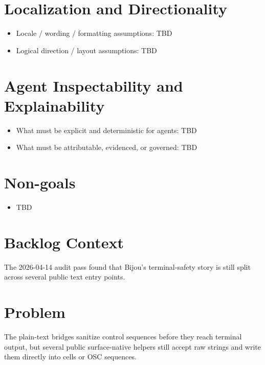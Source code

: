 \section{Localization and Directionality}\label{record-258-localization-and-directionality}

\begin{itemize}
\tightlist
\item
  Locale / wording / formatting assumptions: TBD
\item
  Logical direction / layout assumptions: TBD
\end{itemize}

\section{Agent Inspectability and Explainability}\label{record-258-agent-inspectability-and-explainability}

\begin{itemize}
\tightlist
\item
  What must be explicit and deterministic for agents: TBD
\item
  What must be attributable, evidenced, or governed: TBD
\end{itemize}

\section{Non-goals}\label{record-258-non-goals}

\begin{itemize}
\tightlist
\item[$\square$]
  TBD
\end{itemize}

\section{Backlog Context}\label{record-258-backlog-context}

The 2026-04-14 audit pass found that Bijou's terminal-safety story is still split across several public text entry points.

\section{Problem}\label{record-258-problem}

The plain-text bridges sanitize control sequences before they reach terminal output, but several public surface-native helpers still accept raw strings and write them directly into cells or OSC sequences.

